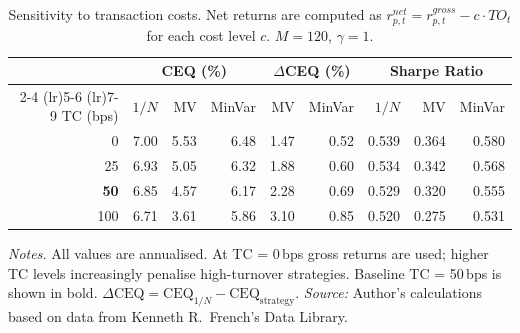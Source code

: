 \begin{table}[htbp]
  \centering
  \caption[Sensitivity to transaction costs]{Sensitivity to transaction costs. Net returns are computed as $r_{p,t}^{net} = r_{p,t}^{gross} - c \cdot TO_{t}$ for each cost level $c$. $M=120$, $\gamma=1$.}
  \label{tab:tc_robust}
  \small
  \begin{tabular}{r *{8}{r}}
    \toprule
    & \multicolumn{3}{c}{CEQ (\%)} & \multicolumn{2}{c}{$\Delta$CEQ (\%)} & \multicolumn{3}{c}{Sharpe Ratio} \\
    \cmidrule(lr){2-4} \cmidrule(lr){5-6} \cmidrule(lr){7-9}
    TC (bps) & $1/N$ & MV & MinVar & MV & MinVar & $1/N$ & MV & MinVar \\
    \midrule
    0 & 7.00 & 5.53 & 6.48 & 1.47 & 0.52 & 0.539 & 0.364 & 0.580 \\
    25 & 6.93 & 5.05 & 6.32 & 1.88 & 0.60 & 0.534 & 0.342 & 0.568 \\
    \textbf{50} & 6.85 & 4.57 & 6.17 & 2.28 & 0.69 & 0.529 & 0.320 & 0.555 \\
    100 & 6.71 & 3.61 & 5.86 & 3.10 & 0.85 & 0.520 & 0.275 & 0.531 \\
    \bottomrule
  \end{tabular}

  \smallskip
  \begin{minipage}{\textwidth}
    \footnotesize
    \textit{Notes.} All values are annualised. At TC = 0\,bps gross returns are used; higher TC levels increasingly penalise high-turnover strategies. Baseline TC = 50\,bps is shown in bold. $\Delta\text{CEQ} = \text{CEQ}_{1/N} - \text{CEQ}_{\text{strategy}}$.
    \textit{Source:} Author's calculations based on data from Kenneth R.\ French's Data Library.
  \end{minipage}
\end{table}
